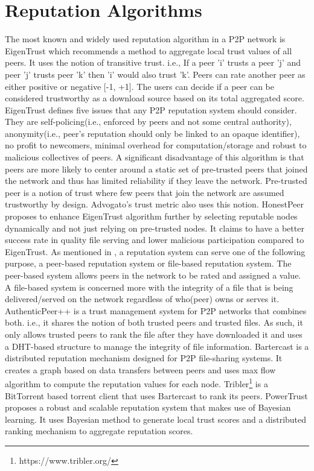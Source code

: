 \section{Reputation Algorithms}
The most known and widely used reputation algorithm in a P2P network is
EigenTrust\cite{kamvar2003eigentrust} which recommends a method to aggregate
local trust values of all peers. It uses the notion of transitive trust. i.e.,
If a peer 'i' trusts a peer 'j' and peer 'j' trusts peer 'k' then 'i' would
also trust 'k'. Peers can rate another peer as either positive or negative [-1,
+1]. The users can decide if a peer can be considered trustworthy as a download
source based on its total aggregated score. EigenTrust defines five issues that
any P2P reputation system should consider. They are self-policing(i.e.,
enforced by peers and not some central authority), anonymity(i.e., peer's
reputation should only be linked to an opaque identifier), no profit to
newcomers, minimal overhead for computation/storage and robust to malicious
collectives of peers. A significant disadvantage of this algorithm is that
peers are more likely to center around a static set of pre-trusted peers that
joined the network and thus has limited reliability if they leave the network.
Pre-trusted peer is a notion of trust where few peers that join the network are
assumed trustworthy by design. Advogato's trust metric\cite{levien2003advogato}
also uses this notion.  HonestPeer\cite{kurdi2015honestpeer} proposes to
enhance EigenTrust algorithm further by selecting reputable nodes dynamically
and not just relying on pre-trusted nodes. It claims to have a better success
rate in quality file serving and lower malicious participation compared to
EigenTrust.
As mentioned in \cite{alkharji2017authenticpeer++}, a reputation system can
serve one of the following purpose, a peer-based reputation system or
file-based reputation system. The peer-based system allows peers in the network
to be rated and assigned a value. A file-based system is concerned more with
the integrity of a file that is being delivered/served on the network
regardless of who(peer) owns or serves it.
AuthenticPeer++\cite{alkharji2017authenticpeer++} is a trust management system
for P2P networks that combines both. i.e., it shares the notion of both trusted
peers and trusted files. As such, it only allows trusted peers to rank the file
after they have downloaded it and uses a DHT-based structure to manage the
integrity of file information. 
Bartercast\cite{meulpolder2009bartercast} is a distributed reputation mechanism
designed for P2P file-sharing systems. It creates a graph based on data
transfers between peers and uses max flow algorithm to compute the reputation
values for each node. Tribler\footnote{https://www.tribler.org/} is a
BitTorrent based torrent client that uses Bartercast to rank its peers. 
PowerTrust\cite{zhou2007powertrust} proposes a robust and scalable reputation
system that makes use of Bayesian learning. It
uses Bayesian method to generate local trust scores and a distributed ranking
mechanism to aggregate reputation scores. 

